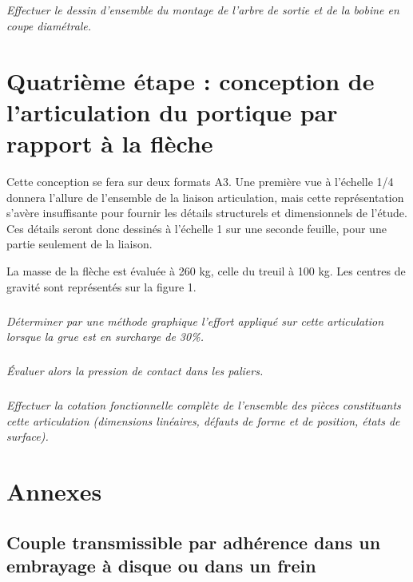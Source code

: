 \documentclass[10pt]{article}
\begin{document}
\subparagraph{}
\textit{Effectuer le dessin d'ensemble du montage de l'arbre de sortie et de la bobine en coupe diamétrale.}


\section{Quatrième étape :  conception de l'articulation du portique par rapport à la flèche}

Cette conception se fera sur deux formats A3. Une première vue à l'échelle 1/4 donnera l'allure de l'ensemble de la liaison articulation, mais cette représentation s'avère insuffisante pour fournir les détails structurels et dimensionnels de l'étude. Ces détails seront donc dessinés à l'échelle 1 sur une seconde feuille, pour une partie seulement de la liaison. 

La masse de la flèche est évaluée à 260 kg, celle du treuil à 100 kg. Les centres de gravité sont représentés sur la figure 1. 

\subparagraph{}
\textit{Déterminer par une méthode graphique l'effort appliqué sur cette articulation lorsque la grue est en surcharge de 30\%.}

\subparagraph{}
\textit{Évaluer alors la pression de contact dans les paliers. }

\subparagraph{}
\textit{Effectuer la cotation fonctionnelle complète de l'ensemble des pièces constituants cette articulation (dimensions linéaires, défauts de forme et de position, états de surface).}


\section*{Annexes}

\subsection*{Couple transmissible par adhérence dans un embrayage à disque ou dans un frein}
\end{document}
